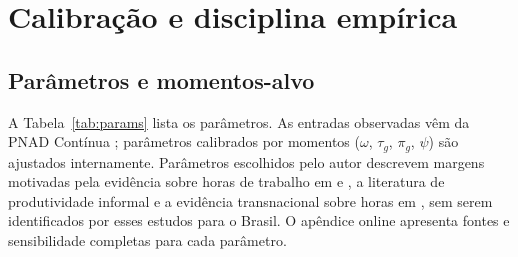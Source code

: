 \section{Calibração e disciplina empírica}\label{sec:calibration}

\subsection{Parâmetros e momentos-alvo}

A Tabela~\ref{tab:params} lista os parâmetros. As entradas observadas vêm da PNAD Contínua \citep{PNAD2024T4Microdados}; parâmetros calibrados por momentos ($\omega$, $\tau_g$, $\pi_g$, $\psi$) são ajustados internamente. Parâmetros escolhidos pelo autor descrevem margens motivadas pela evidência sobre horas de trabalho em \citet{Pencavel2015} e \citet{CollewetSauermann2017}, a literatura de produtividade informal \citep{LaPortaShleifer2014} e a evidência transnacional sobre horas em \citet{BickFuchsSchundelnLagakos2018}, sem serem identificados por esses estudos para o Brasil. O apêndice online apresenta fontes e sensibilidade completas para cada parâmetro.

